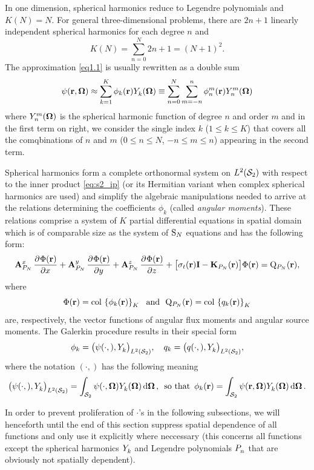 In one dimension, spherical harmonics reduce to 
Legendre polynomials and $ K(N) = N$.
For general three-dimensional problems, there are $2n + 1$ linearly independent spherical harmonics for each degree $n$ 
and 
$$ 
	K(N) = \sum_{n=0}^{N} 2n + 1 = (N+1)^2.
$$
%
The approximation \eqref{eq1.1} is usually rewritten as a double sum
\begin{equation}\label{eq:pn_approx}
	\psi(\br,\bomega) \approx \sum_{k=1}^{ K} \phi_k(\br)\Y{k}{}(\bomega) \equiv
	\suma[n]{0}{N}\suma[m]{-n}{n}\angmom{n}{m}(\br)\Y{n}{m}(\bomega)
\end{equation}
where $\Y{n}{m}(\bomega)$ is the spherical harmonic function of degree $n$ and order $m$
and in the first term on right, we consider the single index $k$ ($1 \leq k \leq  K$) that covers all the comqbinations
of $n$ and $m$ ($0 \leq n \leq N$, $-n\leq m \leq n$) appearing in the second term.

Spherical harmonics form a complete orthonormal system on $\Lp[2](\Sphere)$ with respect to the inner product
\eqref{eq:s2_ip} (or its Hermitian variant when complex spherical harmonics are used) and simplify the algebraic
manipulations needed to arrive at the relations determining the coefficients $\phi_k$ (called \textit{angular moments}).
These relations comprise a system of $ K$
partial differential equations in spatial domain which is of comparable size as the system of $\SN$ equations and has 
the following form:
\begin{equation}\label{eq:pn1}
	\mat{A}^x_{P_N}\,\pd{\Phi(\br)}{x} + \mat{A}^y_{P_N}\,\pd{\Phi(\br)}{y} + \mat{A}^z_{P_N}\,\pd{\Phi(\br)}{z} +
	\bigl[\sigma_t(\br)\mat{I} - \mathbf{K}_{P_N}(\br)\bigr]\Phi(\br) = \mathrm{Q}_{P_N}(\br),
\end{equation}
where 
\begin{equation}\label{eq:pn_vectors}
	\Phi(\br) = \col\left\{\phi_k(\br)\right\}_{\idxset{K}} \ \text{ and }\ 
	\mathrm{Q}_{P_N}(\br) = \col\left\{q_k(\br)\right\}_{\idxset{K}}
\end{equation}
are, respectively, the vector functions of angular flux
moments and angular source moments.
The
Galerkin procedure results in their special form
\begin{equation}\label{eq:pn_vars}
	\phi_k = \ipsl{\psi(\cdot,)}{\Y{k}{}},\quad q_k = \ipsl{q(\cdot,)}{\Y{k}{}},
\end{equation}
where the notation $(\cdot,)$ has the following meaning
$$
 	\ipsl{\psi(\cdot,)}{\Y{k}{}} = \intA{\psi(\cdot,\bomega) \Y{k}{}(\bomega)},\ \, \mbox{so
 	that}\ \, \phi_k(\br) = \intA{\psi(\br,\bomega) \Y{k}{}(\bomega)}. 
$$
\begin{remark}
In order to prevent proliferation of $\cdot$'s in the following subsections, we will henceforth until the end of this
section \sref{sec:PN} suppress spatial dependence of all functions and only use it explicitly where neccessary (this
concerns all functions except the spherical harmonics $\Y{k}{}$ and Legendre polynomials $\P{n}{}$ that are obviously not spatially
dependent).
\end{remark}


